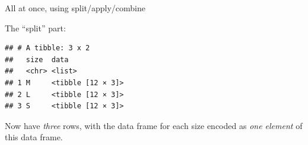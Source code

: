 \documentclass[ignorenonframetext,]{beamer}
\newenvironment{Shaded}{\begin{snugshade}}{\end{snugshade}}
\newcommand{\KeywordTok}[1]{\textcolor[rgb]{0.13,0.29,0.53}{\textbf{#1}}}
\newcommand{\NormalTok}[1]{#1}
\newcommand{\OperatorTok}[1]{\textcolor[rgb]{0.81,0.36,0.00}{\textbf{#1}}}
\newcommand{\StringTok}[1]{\textcolor[rgb]{0.31,0.60,0.02}{#1}}
\begin{document}
\begin{frame}[fragile]{All at once, using split/apply/combine}
\protect\hypertarget{all-at-once-using-splitapplycombine}{}

The ``split'' part:

\begin{Shaded}
\end{Shaded}

\begin{verbatim}
## # A tibble: 3 x 2
##   size  data             
##   <chr> <list>           
## 1 M     <tibble [12 × 3]>
## 2 L     <tibble [12 × 3]>
## 3 S     <tibble [12 × 3]>
\end{verbatim}

Now have \emph{three} rows, with the data frame for each size encoded as
\emph{one element} of this data frame.

\end{frame}
\end{document}
